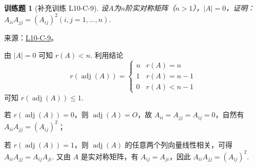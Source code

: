 \documentclass[12pt,fontset=fandol]{ctexart}
\newtheorem{exercise}{训练题}[section]
\begin{document}
\begin{exercise}[补充训练 L10-C-9]\label{prob:L10-C-9}
设$A$为$n$阶实对称矩阵（$n>1$），$|A|=0$，证明：$A_{ii}A_{jj}=(A_{ij})^2(i,j=1,\ldots,n)$.
\end{exercise}
\noindent 来源：\href{https://github.com/yhwu-is/Linear-Algebra-Left-Undone/blob/new/%E8%AE%B2%E4%B9%89/%E4%B8%93%E9%A2%98/10%20%E8%A1%8C%E5%88%97%E5%BC%8F.tex}{L10-C-9}。
\begin{solve}
由 $|A| = 0$ 可知 $r(A) < n$. 利用结论
            \[
                r(\operatorname{adj}(A))=\begin{cases}
                    n & r(A)=n     \\
                    1 & r(A)=n-1   \\
                    0 & r(A) < n-1
                \end{cases}
            \]
            可知 $r(\operatorname{adj}(A)) \leqslant 1$.

            若 $r(\operatorname{adj}(A)) = 0$，则 $\operatorname{adj}(A) = O$，故 $A_{ii} = A_{jj} = A_{ij} = 0$，自然有 $A_{ii}A_{jj}=(A_{ij})^2$；

            若 $r(\operatorname{adj}(A)) = 1$，则 $\operatorname{adj}(A)$ 的任意两个列向量线性相关，可得 $A_{ii}A_{jj} = A_{ij}A_{ji}$. 又由 $A$ 是实对称矩阵，有 $A_{ij} = A_{ji}$，因此 $A_{ii}A_{jj} = (A_{ij})^2$.
\end{solve}
\end{document}
